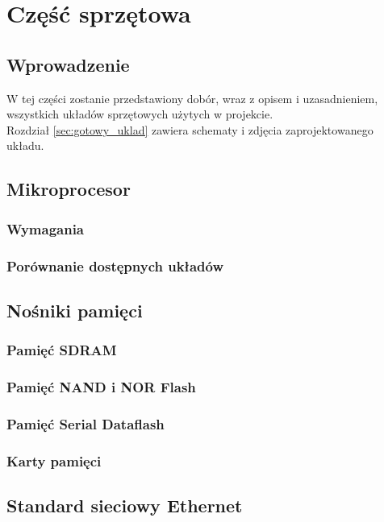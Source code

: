 \documentclass[a4paper,12pt]{book}
\begin{document}

	\chapter{Część sprzętowa}
		\section{Wprowadzenie}
			W tej części zostanie przedstawiony dobór, wraz z opisem i uzasadnieniem, wszystkich układów sprzętowych użytych w projekcie.\\
			Rozdział \ref{sec:gotowy_uklad} zawiera schematy i zdjęcia zaprojektowanego układu.
		\section{Mikroprocesor}
			\subsection{Wymagania}
			\subsection{Porównanie dostępnych układów}
		\section{Nośniki pamięci}
			\subsection{Pamięć SDRAM}			
			\subsection{Pamięć NAND i NOR Flash}
				
			\subsection{Pamięć Serial Dataflash}
			\subsection{Karty pamięci}
		\section{Standard sieciowy Ethernet}
\end{document}
